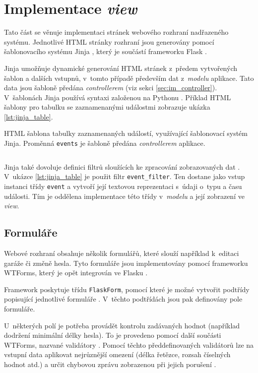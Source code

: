 \section{Implementace \textit{view}}

Tato část se věnuje implementaci stránek webového rozhraní nadřazeného systému. Jednotlivé HTML stránky rozhraní jsou generovány pomocí šablonovacího systému Jinja \cite{jinja}, který je součástí frameworku Flask \cite{flask_templates}. 

Jinja umožňuje dynamické generování HTML stránek z~předem vytvořených šablon a dalších vstupnů, v~tomto případě především dat z~\textit{modelu} aplikace. Tato data jsou šabloně předána \textit{controllerem} (viz sekci \ref{sec:im_controller}). V~šablonách Jinja používá syntaxi založenou na Pythonu \cite{jinja}. Příklad HTML šablony pro tabulku se zaznamenanými událostmi zobrazuje ukázka \ref{lst:jinja_table}.

\begin{listing}[htbp]
\caption{\label{lst:jinja_table} HTML šablona tabulky zaznamenaných událostí, využívající šablonovací systém Jinja. Proměnná \texttt{events} je šabloně předána \textit{controllerem} aplikace.}
\inputminted[bgcolor=codebg]{html}{source-samples/jinja_table.html}
\end{listing}

Jinja také dovoluje definici filtrů sloužících ke zpracování zobrazovaných dat \cite{jinja}. V~ukázce \ref{lst:jinja_table} je použit filtr \texttt{event\_filter}. Ten dostane jako vstup instanci třídy \texttt{event} a vytvoří její textovou reprezentaci s~údaji o~typu a času události. Tím je oddělena implementace této třídy v~\textit{modelu} a její zobrazení ve \textit{view}.

\subsection{Formuláře}
\label{sec:im_forms}

Webové rozhraní obsahuje několik formulářů, které slouží například k~editaci garáže či změně hesla. Tyto formuláře jsou implementovány pomocí frameworku WTForms, který je opět integrován ve Flasku \cite{flask_wtf}.

Framework poskytuje třídu \texttt{FlaskForm}, pomocí které je možné vytvořit podtřídy popisující jednotlivé formuláře \cite{flask_wtf}. V~těchto podtřídách jsou pak definovány pole formuláře.

U~některých polí je potřeba provádět kontrolu zadávaných hodnot (například dodržení minimální délky hesla). To je provedeno pomocí další součásti WTForms, nazvané validátory \cite{flask_wtf}. Pomocí těchto předdefinovaných validátorů lze na vstupní data aplikovat nejrůznější omezení (délka řetězce, rozsah číselných hodnot atd.) a určit chybovou zprávu zobrazenou při jejich porušení \cite{flask_wtf}.

